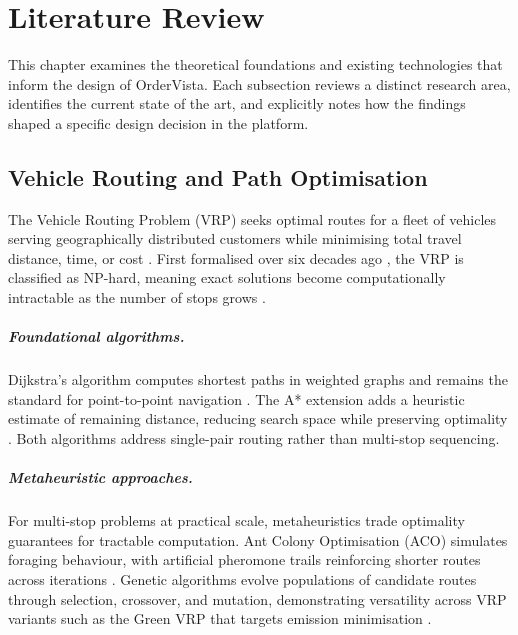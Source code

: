 \chapter{Literature Review}
\label{ch:literature}

This chapter examines the theoretical foundations and existing technologies that inform the design of OrderVista. Each subsection reviews a distinct research area, identifies the current state of the art, and explicitly notes how the findings shaped a specific design decision in the platform.

\section{Vehicle Routing and Path Optimisation}
\label{sec:lit-routing}

The Vehicle Routing Problem (VRP) seeks optimal routes for a fleet of vehicles serving geographically distributed customers while minimising total travel distance, time, or cost \autocite{toth2002vehicle}. First formalised over six decades ago \autocite{dantzig1959truck}, the VRP is classified as NP-hard, meaning exact solutions become computationally intractable as the number of stops grows \autocite{laporte2009fifty}.

\paragraph{Foundational algorithms.}
Dijkstra's algorithm computes shortest paths in weighted graphs and remains the standard for point-to-point navigation \autocite{dijkstra1959note}. The A* extension adds a heuristic estimate of remaining distance, reducing search space while preserving optimality \autocite{hart1968formal}. Both algorithms address single-pair routing rather than multi-stop sequencing.

\paragraph{Metaheuristic approaches.}
For multi-stop problems at practical scale, metaheuristics trade optimality guarantees for tractable computation. Ant Colony Optimisation (ACO) simulates foraging behaviour, with artificial pheromone trails reinforcing shorter routes across iterations \autocite{dorigo1997ant}. Genetic algorithms evolve populations of candidate routes through selection, crossover, and mutation, demonstrating versatility across VRP variants such as the Green VRP that targets emission minimisation \autocite{erdogan2012green}.

